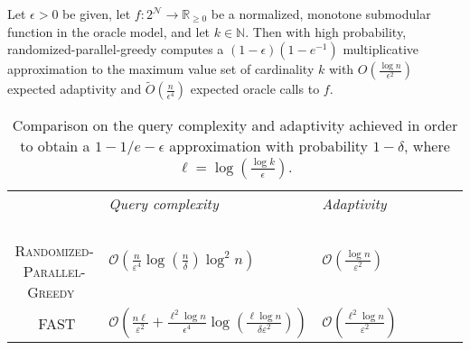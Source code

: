 \documentclass[11pt, a4paper]{article}
\begin{document}
\begin{theorem}
Let $\epsilon>0$ be given, let $f: 2^{\mathcal{N}} \rightarrow \mathbb{R}_{\geq 0}$ be a normalized, monotone submodular function in the oracle model, and let $k \in \mathbb{N}$. Then with high probability, randomized-parallel-greedy computes a $(1-\epsilon)\left(1-e^{-1}\right)$ multiplicative approximation to the maximum value set of cardinality $k$ with $O\left(\frac{\log n}{\epsilon^{2}}\right)$ expected adaptivity and $\tilde{O}\left(\frac{n}{\epsilon^{4}}\right)$ expected oracle calls to $f$.
\end{theorem}

\begin{table}[h]
\begin{center}
\begin{tabular}{cllllll}\vspace{0.2cm}
        & \emph{Query complexity} & \emph{Adaptivity} &   \\\ \vspace{0.3cm}
 \textsc{Randomized-Parallel-Greedy}~\cite{chekuri2018submodular}& $\mathcal{O}\left(  \frac{n}{\varepsilon^4}  \log\left(\frac{n}{\delta}\right) \log^2 n\right)  $ & $ \mathcal{O}\left(\frac{\log n}{\varepsilon^2}  \right)$ & \\\ \vspace{0.3cm}
  \textsc{FAST}~\cite{breuer2019fast} &     $\mathcal{O}\left(\frac{  n \ell}{\varepsilon^2} +  \frac{ \ell^2 \log n}{\epsilon^4}   \log(\frac{\ell\log n}{\delta \varepsilon^2})\right)$        &   $\mathcal{O}\left(\frac{ \ell^2 \log n}{\varepsilon^2}\right)$   & 
\end{tabular}
  \caption{Comparison on the query complexity and adaptivity achieved in order to obtain a $1-1/e-\epsilon$ approximation with probability $1 - \delta$, where  $\ell = \log(\frac{\log k}{\epsilon})$.  }
  \label{tab:queries}
\end{center}
\end{table}
\end{document}
